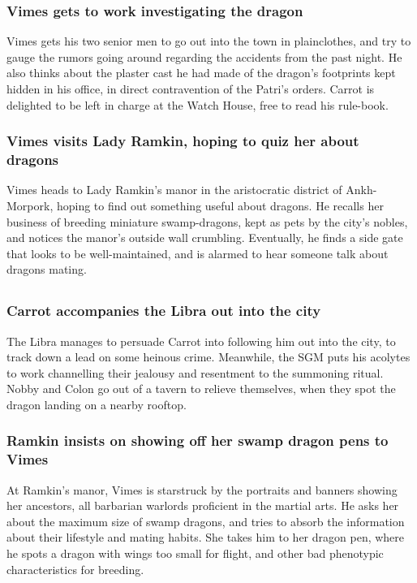\subsubsection{\Gls{Vimes} gets to work investigating the dragon}
\Gls{Vimes} gets his two senior men to go out into the town in plainclothes, and try to gauge the
rumors going around regarding the accidents from the past night. He also thinks about the plaster
cast he had made of the dragon's footprints kept hidden in his office, in direct contravention of
the \Gls{Patri}'s orders. \Gls{Carrot} is delighted to be left in charge at the Watch House, free to
read his rule-book.

\subsubsection{\Gls{Vimes} visits Lady \Gls{Ramkin}, hoping to quiz her about dragons}
\Gls{Vimes} heads to Lady \Gls{Ramkin}'s manor in the aristocratic district of Ankh-Morpork, hoping
to find out something useful about dragons. He recalls her business of breeding miniature
swamp-dragons, kept as pets by the city's nobles, and notices the manor's outside wall crumbling.
Eventually, he finds a side gate that looks to be well-maintained, and is alarmed to hear someone
talk about dragons mating.

\subsection{}
\subsubsection{\Gls{Carrot} accompanies the \Gls{Libra} out into the city}
The \Gls{Libra} manages to persuade \Gls{Carrot} into following him out into the city, to track
down a lead on some heinous crime. Meanwhile, the \Gls{SGM} puts his acolytes to work channelling
their jealousy and resentment to the summoning ritual. \Gls{Nobby} and \Gls{Colon} go out of a
tavern to relieve themselves, when they spot the dragon landing on a nearby rooftop.

\subsubsection{\Gls{Ramkin} insists on showing off her swamp dragon pens to \Gls{Vimes}}
At \Gls{Ramkin}'s manor, \Gls{Vimes} is starstruck by the portraits and banners showing her
ancestors, all barbarian warlords proficient in the martial arts. He asks her about the maximum
size of swamp dragons, and tries to absorb the information about their lifestyle and mating habits.
She takes him to her dragon pen, where he spots a dragon with wings too small for flight, and other
bad phenotypic characteristics for breeding.

